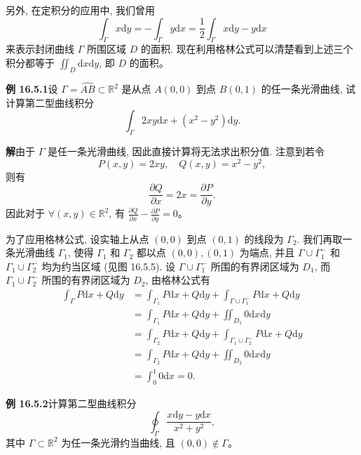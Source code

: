 \documentclass[UTF8, 12pt, fontset=fandol, oneside]{ctexart}
\begin{document}
另外, 在定积分的应用中, 我们曾用
\[
  \int_\Gamma x\mathrm dy=-\int_\Gamma y\mathrm dx
  =\frac12\int_\Gamma x\mathrm dy-y\mathrm dx
\]
来表示封闭曲线 $\Gamma$ 所围区域 $D$ 的面积. 现在利用格林公式可以清楚看到上述三个积分都等于 $\iint_D\mathrm dx\mathrm dy$, 即 $D$ 的面积。

\noindent\textbf{例 16.5.1}\quad 设 $\Gamma=\widehat{AB}\subset\mathbb R^2$ 是从点 $A(0,0)$ 到点 $B(0,1)$ 的任一条光滑曲线, 试计算第二型曲线积分
\[
  \int_\Gamma 2xy\mathrm dx+(x^2-y^2)\mathrm dy.
\]

\noindent\textbf{解}\quad 由于 $\Gamma$ 是任一条光滑曲线, 因此直接计算将无法求出积分值. 注意到若令
\[
  P(x,y)=2xy,\quad Q(x,y)=x^2-y^2,
\]
则有
\[
  \frac{\partial Q}{\partial x}=2x=\frac{\partial P}{\partial y}.
\]
因此对于 $\forall(x,y)\in\mathbb R^2$, 有 $\frac{\partial Q}{\partial x}-\frac{\partial P}{\partial y}=0$。

为了应用格林公式, 设实轴上从点 $(0,0)$ 到点 $(0,1)$ 的线段为 $\Gamma_2$. 我们再取一条光滑曲线 $\Gamma_1$, 使得 $\Gamma_1$ 和 $\Gamma_2$ 都以点 $(0,0),(0,1)$ 为端点, 并且 $\Gamma\cup\Gamma_1^-$ 和 $\Gamma_1\cup\Gamma_2^-$ 均为约当区域 (见图 16.5.5). 设 $\Gamma\cup\Gamma_1^-$ 所围的有界闭区域为 $D_1$, 而 $\Gamma_1\cup\Gamma_2^-$ 所围的有界闭区域为 $D_2$, 由格林公式有
\[
\begin{aligned}
  \int_\Gamma P\mathrm dx+Q\mathrm dy
  &=\int_{\Gamma_1}P\mathrm dx+Q\mathrm dy+\int_{\Gamma\cup\Gamma_1^-}P\mathrm dx+Q\mathrm dy\\
  &=\int_{\Gamma_1}P\mathrm dx+Q\mathrm dy+\iint_{D_1}0\mathrm dx\mathrm dy\\
  &=\int_{\Gamma_2}P\mathrm dx+Q\mathrm dy+\int_{\Gamma_1\cup\Gamma_2^-}P\mathrm dx+Q\mathrm dy\\
  &=\int_{\Gamma_2}P\mathrm dx+Q\mathrm dy+\iint_{D_2}0\mathrm dx\mathrm dy\\
  &=\int_0^1 0\mathrm dx=0.
\end{aligned}
\]

\noindent\textbf{例 16.5.2}\quad 计算第二型曲线积分
\[
  \oint_\Gamma\frac{x\mathrm dy-y\mathrm dx}{x^2+y^2},
\]
其中 $\Gamma\subset\mathbb R^2$ 为任一条光滑约当曲线, 且 $(0,0)\notin\Gamma$。
\end{document}
